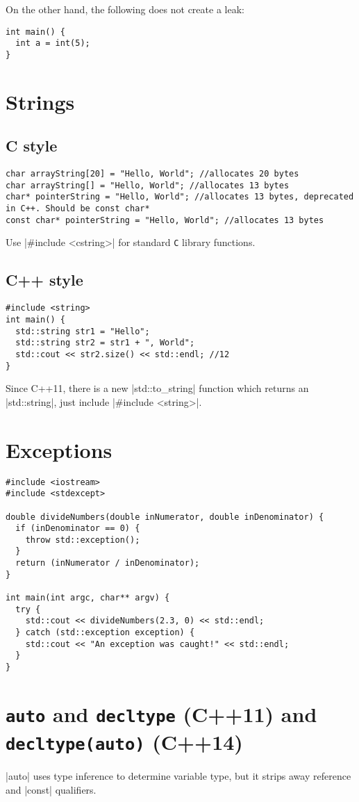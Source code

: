 \documentclass[a4paper,12pt,oneside]{book}
\begin{document}
{On the other hand, the following does not create a leak:
\begin{lstlisting}[caption={No memory leak}]
int main() {
  int a = int(5);
}
\end{lstlisting}

\section{Strings}
\subsection{C style}
\begin{lstlisting}
char arrayString[20] = "Hello, World"; //allocates 20 bytes
char arrayString[] = "Hello, World"; //allocates 13 bytes
char* pointerString = "Hello, World"; //allocates 13 bytes, deprecated in C++. Should be const char*
const char* pointerString = "Hello, World"; //allocates 13 bytes
\end{lstlisting}

Use \lst|#include <cstring>| for standard \verb|C| library functions.
\subsection{C++ style}
\begin{lstlisting}
#include <string>
int main() {
  std::string str1 = "Hello";
  std::string str2 = str1 + ", World";
  std::cout << str2.size() << std::endl; //12
}
\end{lstlisting}

Since C++11, there is a new \lst|std::to_string| function which returns an \lst|std::string|, just include \lst|#include <string>|.
\section{Exceptions}
\begin{lstlisting}
#include <iostream>
#include <stdexcept>

double divideNumbers(double inNumerator, double inDenominator) {
  if (inDenominator == 0) {
    throw std::exception();
  }
  return (inNumerator / inDenominator);
}

int main(int argc, char** argv) {
  try {
    std::cout << divideNumbers(2.3, 0) << std::endl;
  } catch (std::exception exception) {
    std::cout << "An exception was caught!" << std::endl;
  }
}
\end{lstlisting}

\section{\texttt{auto} and \texttt{decltype} (C++11) and \texttt{decltype(auto)} (C++14)}
\lst|auto| uses type inference to determine variable type, but it strips away reference and \lst|const| qualifiers.

}
\end{document}

